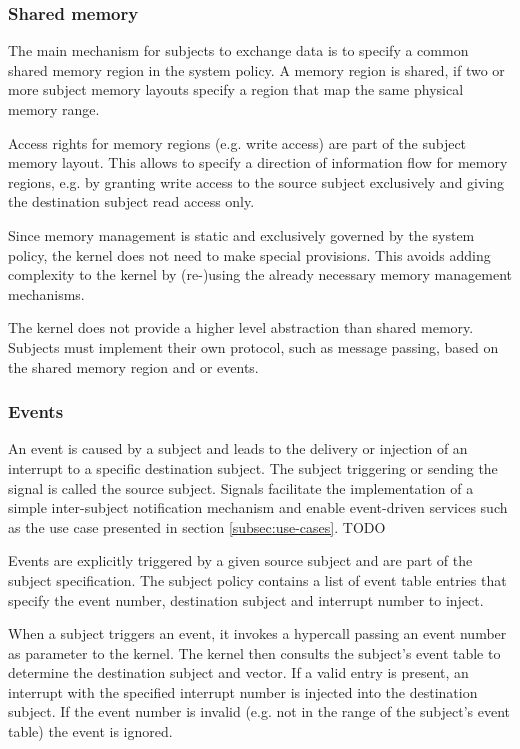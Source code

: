 \subsubsection{Shared memory}
The main mechanism for subjects to exchange data is to specify a common shared
memory region in the system policy. A memory region is shared, if two or more
subject memory layouts specify a region that map the same physical memory range.

Access rights for memory regions (e.g. write access) are part of the subject
memory layout. This allows to specify a direction of information flow for memory
regions, e.g. by granting write access to the source subject exclusively and
giving the destination subject read access only.

Since memory management is static and exclusively governed by the system policy,
the kernel does not need to make special provisions. This avoids adding
complexity to the kernel by (re-)using the already necessary memory management
mechanisms.

The kernel does not provide a higher level abstraction than shared memory.
Subjects must implement their own protocol, such as message passing, based on
the shared memory region and or events.

\subsubsection{Events}
An event is caused by a subject and leads to the delivery or injection of an
interrupt to a specific destination subject. The subject triggering or sending
the signal is called the source subject. Signals facilitate the implementation
of a simple inter-subject notification mechanism and enable event-driven
services such as the use case presented in section \ref{subsec:use-cases}. TODO

Events are explicitly triggered by a given source subject and are part of the
subject specification. The subject policy contains a list of event table entries
that specify the event number, destination subject and interrupt number to
inject.

When a subject triggers an event, it invokes a hypercall passing an event number
as parameter to the kernel. The kernel then consults the subject's event table
to determine the destination subject and vector. If a valid entry is present, an
interrupt with the specified interrupt number is injected into the destination
subject. If the event number is invalid (e.g. not in the range of the subject's
event table) the event is ignored.

